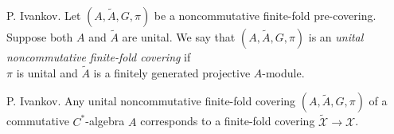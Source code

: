 \documentclass{beamer}
\theoremstyle{plain}
\begin{document}
\begin{frame}
\begin{definition}
	\alert{P. Ivankov}.
	  	Let $\left(A, \widetilde{A}, G, \pi \right)$ be a  noncommutative finite-fold  pre-covering. Suppose both $A$ and  $\widetilde{A}$ are unital. We say that $\left(A, \widetilde{A}, G, \pi \right)$ is an \textit{unital noncommutative finite-fold  covering} if \\ $\pi$ is unital and $\widetilde{A}$ is a finitely generated projective  $A$-module.
\end{definition}
\begin{corollary}\alert{P. Ivankov}.
	Any unital noncommutative finite-fold  covering $\left(A, \widetilde{A}, G, \pi \right)$ of a commutative $C^*$-algebra $A$ corresponds to a finite-fold covering $ \widetilde{\mathcal  X}\to \mathcal  X$.
\end{corollary}
\end{frame}
\end{document}
